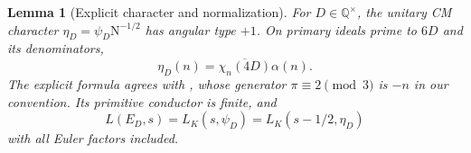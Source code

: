 \documentclass[11pt,a4paper]{article}
\numberwithin{equation}{section}
\newtheorem{lemma}[theorem]{Lemma}
\theoremstyle{definition}
\theoremstyle{remark}
\newcommand{\Q}{\mathbb Q}
\newcommand{\N}{\mathrm N}
\begin{document}
\begin{lemma}[Explicit character and normalization]\label{lem:CM}
For $D\in\Q^\times$, the unitary CM character $\eta_D=\psi_D\N^{-1/2}$ has angular type $+1$. On primary ideals prime to $6D$ and its denominators,
\begin{equation}\label{eq:etaD}
 \eta_D(n)=\overline{\chi_n(4D)}\alpha(n).
\end{equation}
The explicit formula agrees with \cite[Chapter II, Example 10.6, pp.~177--178]{Silverman}, whose generator $\pi\equiv2\pmod3$ is $-n$ in our convention. Its primitive conductor is finite, and
\begin{equation}\label{eq:ellipticshift}
 L(E_D,s)=L_K(s,\psi_D)=L_K(s-1/2,\eta_D)
\end{equation}
with all Euler factors included.
\end{lemma}
\end{document}
